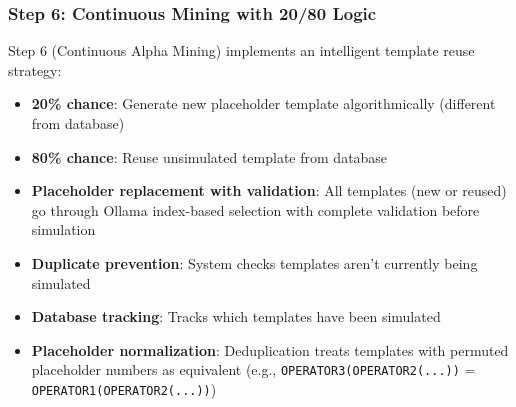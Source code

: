 \subsubsection{Step 6: Continuous Mining with 20/80 Logic}

Step 6 (Continuous Alpha Mining) implements an intelligent template reuse strategy:

\begin{itemize}
    \item \textbf{20\% chance}: Generate new placeholder template algorithmically (different from database)
    \item \textbf{80\% chance}: Reuse unsimulated template from database
    \item \textbf{Placeholder replacement with validation}: All templates (new or reused) go through Ollama index-based selection with complete validation before simulation
    \item \textbf{Duplicate prevention}: System checks templates aren't currently being simulated
    \item \textbf{Database tracking}: Tracks which templates have been simulated
    \item \textbf{Placeholder normalization}: Deduplication treats templates with permuted placeholder numbers as equivalent (e.g., \texttt{OPERATOR3(OPERATOR2(...))} = \texttt{OPERATOR1(OPERATOR2(...))})
\end{itemize}

